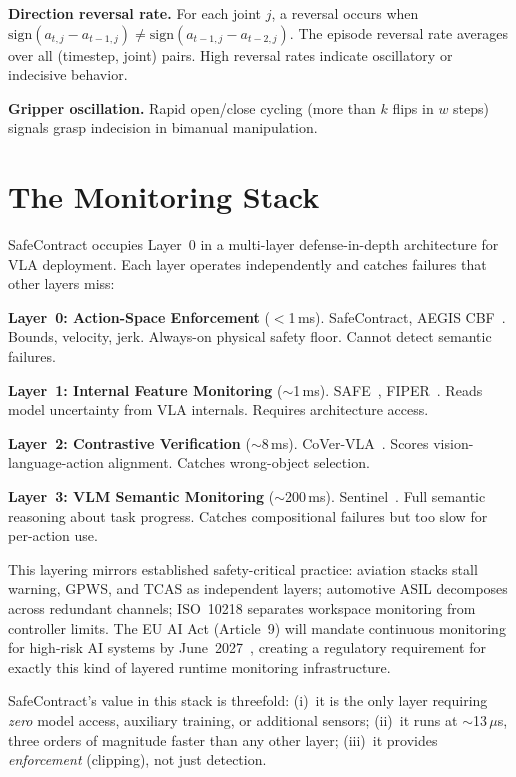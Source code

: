 \documentclass[conference]{IEEEtran}
\begin{document}
\noindent\textbf{Direction reversal rate.}
For each joint $j$, a reversal occurs when $\text{sign}(a_{t,j} - a_{t-1,j}) \neq \text{sign}(a_{t-1,j} - a_{t-2,j})$.
The episode reversal rate averages over all (timestep, joint) pairs.
High reversal rates indicate oscillatory or indecisive behavior.

\noindent\textbf{Gripper oscillation.}
Rapid open/close cycling (more than $k$ flips in $w$ steps) signals grasp indecision in bimanual manipulation.

\section{The Monitoring Stack}
\label{sec:stack}

SafeContract occupies Layer~0 in a multi-layer defense-in-depth architecture for VLA deployment.
Each layer operates independently and catches failures that other layers miss:

\smallskip
\noindent\textbf{Layer~0: Action-Space Enforcement} ($<$1\,ms). SafeContract, AEGIS CBF~\cite{aegis}. Bounds, velocity, jerk. Always-on physical safety floor. Cannot detect semantic failures.

\noindent\textbf{Layer~1: Internal Feature Monitoring} (${\sim}$1\,ms). SAFE~\cite{safe2025}, FIPER~\cite{fiper2025}. Reads model uncertainty from VLA internals. Requires architecture access.

\noindent\textbf{Layer~2: Contrastive Verification} (${\sim}$8\,ms). CoVer-VLA~\cite{cover2026}. Scores vision-language-action alignment. Catches wrong-object selection.

\noindent\textbf{Layer~3: VLM Semantic Monitoring} (${\sim}$200\,ms). Sentinel~\cite{sentinel}. Full semantic reasoning about task progress. Catches compositional failures but too slow for per-action use.
\smallskip

This layering mirrors established safety-critical practice: aviation stacks stall warning, GPWS, and TCAS as independent layers; automotive ASIL decomposes across redundant channels; ISO~10218 separates workspace monitoring from controller limits.
The EU AI Act (Article~9) will mandate continuous monitoring for high-risk AI systems by June~2027~\cite{euaiact}, creating a regulatory requirement for exactly this kind of layered runtime monitoring infrastructure.

SafeContract's value in this stack is threefold: (i)~it is the only layer requiring \emph{zero} model access, auxiliary training, or additional sensors; (ii)~it runs at ${\sim}$13\,$\mu$s, three orders of magnitude faster than any other layer; (iii)~it provides \emph{enforcement} (clipping), not just detection.
\end{document}
